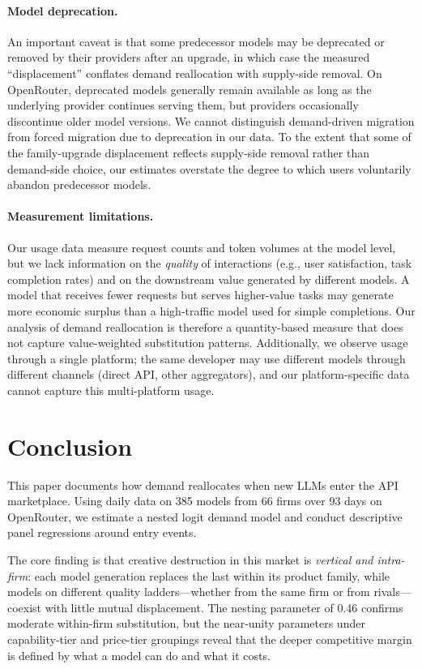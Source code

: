 \documentclass[11pt, a4paper]{article}
\begin{document}
\paragraph{Model deprecation.} An important caveat is that some predecessor models may be deprecated or removed by their providers after an upgrade, in which case the measured ``displacement'' conflates demand reallocation with supply-side removal. On OpenRouter, deprecated models generally remain available as long as the underlying provider continues serving them, but providers occasionally discontinue older model versions. We cannot distinguish demand-driven migration from forced migration due to deprecation in our data. To the extent that some of the family-upgrade displacement reflects supply-side removal rather than demand-side choice, our estimates overstate the degree to which users voluntarily abandon predecessor models.

\paragraph{Measurement limitations.} Our usage data measure request counts and token volumes at the model level, but we lack information on the \emph{quality} of interactions (e.g., user satisfaction, task completion rates) and on the downstream value generated by different models. A model that receives fewer requests but serves higher-value tasks may generate more economic surplus than a high-traffic model used for simple completions. Our analysis of demand reallocation is therefore a quantity-based measure that does not capture value-weighted substitution patterns. Additionally, we observe usage through a single platform; the same developer may use different models through different channels (direct API, other aggregators), and our platform-specific data cannot capture this multi-platform usage.

\section{Conclusion}
\label{sec:conclusion}

This paper documents how demand reallocates when new LLMs enter the API marketplace. Using daily data on 385 models from 66 firms over 93 days on OpenRouter, we estimate a nested logit demand model and conduct descriptive panel regressions around entry events.

The core finding is that creative destruction in this market is \emph{vertical and intra-firm}: each model generation replaces the last within its product family, while models on different quality ladders---whether from the same firm or from rivals---coexist with little mutual displacement. The nesting parameter of 0.46 confirms moderate within-firm substitution, but the near-unity parameters under capability-tier and price-tier groupings reveal that the deeper competitive margin is defined by what a model can do and what it costs.
\end{document}
